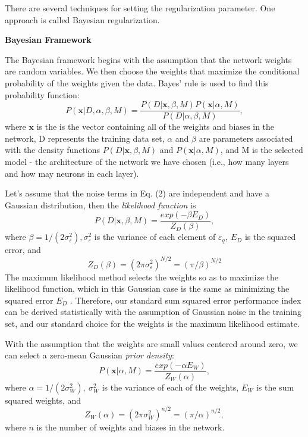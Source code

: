 \documentclass[a4paper, 12pt, english, parskip]{scrartcl}
\begin{document}
There are several techniques for setting the regularization parameter. One approach is called Bayesian regularization.

\textbf{Bayesian Framework}

The Bayesian framework begins with the assumption that the network weights are random variables. We then choose the weights that maximize the conditional probability of the weights given the data. Bayes' rule is used to find this probability function:
\begin{equation}
P(\boldsymbol{x} \vert D, \alpha, \beta, M) = \frac{P(D \vert \boldsymbol{x}, \beta, M) P(\boldsymbol{x} \vert \alpha, M)}{P(D \vert \alpha, \beta, M)},
\end{equation}
where $\boldsymbol{x}$ is the is the vector containing all of the weights and biases in the network, D represents the training data set, $\alpha$ and $\beta$ are parameters associated with the density functions $P(D \vert \boldsymbol{x}, \beta, M)$ and $P(\boldsymbol{x} \vert \alpha, M)$, and M is the selected model - the architecture of the network we have chosen (i.e., how many layers and how may neurons in each layer).

Let's assume that the noise terms in Eq. (2) are independent and have a Gaussian distribution, then the \textit{likelihood function} is
\begin{equation}
P(D \vert \boldsymbol{x}, \beta, M) = \frac{exp(-\beta E_D)}{Z_D(\beta)},
\end{equation}
where $\beta = 1 / (2 \sigma_\varepsilon ^ 2 ), \sigma_\varepsilon ^2$ is the variance of each element of $\varepsilon_q,~ E_D$ is the squared error, and 
\begin{equation}
    Z_D(\beta) = (2 \pi \sigma_\varepsilon ^2)^{N / 2} = (\pi / \beta)^{N / 2}
\end{equation}
The maximum likelihood method selects the weights so as to maximize the likelihood function, which in this Gaussian case is the same as minimizing the squared error $E_D$ . Therefore, our standard sum squared error performance index can be derived statistically with the assumption of Gaussian noise in the training set, and our standard choice for the weights is the maximum likelihood estimate.

With the assumption that the weights are small values centered around zero, we can select a zero-mean Gaussian \textit{prior density}:
\begin{equation}
    P(\boldsymbol{x} \vert \alpha, M) = \frac{exp(-\alpha E_W)}{Z_W(\alpha)},
\end{equation}
where $\alpha = 1 / (2 \sigma_W ^ 2 ), ~\sigma_W ^2$ is the variance of each of the weights, $E_W$ is the sum squared weights, and 
\begin{equation}
    Z_W(\alpha) = (2 \pi \sigma_W ^2)^{n/2} = (\pi / \alpha)^{n / 2},
\end{equation}
where $n$ is the number of weights and biases in the network.
\end{document}
